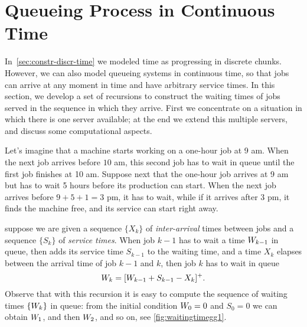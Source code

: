 



\section{Queueing Process in Continuous Time}
\label{sec:constr-gg1-queu}

In~\cref{sec:constr-discr-time} we modeled time as progressing in discrete chunks.
However, we can also model queueing systems in continuous time, so that jobs can arrive at any moment in time and have arbitrary service times.
In this section, we develop a set of recursions to construct the waiting times of jobs served in the sequence in which they arrive.
First we concentrate on a situation in which there is one server available; at the end we extend this multiple servers, and discuss some computational aspects.


Let's imagine that a machine starts working on a one-hour job at 9 am.
When the next job arrives before $10$ am, this second job has to wait in queue until the first job finishes at 10 am.
Suppose next that the one-hour job arrives at 9 am but has to wait 5 hours before its production can start.
When the next job arrives before $9+5+1= 3$ pm, it has to wait, while if it arrives after 3 pm, it finds the machine free, and its service can start right away.

 suppose we are given a sequence $\{X_k\}$ of \emph{inter-arrival} times between jobs and a sequence $\{S_k\}$ of \emph{service times}.
When job $k-1$ has to wait a time $W_{k-1}$ in queue, then adds its service time $S_{k-1}$ to the waiting time, and a time $X_k$ elapses between the arrival time of job $k-1$ and $k$, then job $k$ has to wait in queue
\begin{equation}\label{eq:56}
 W_{k} = [W_{k-1} + S_{k-1}-X_k]^+.
\end{equation}
Observe
that with this recursion it is easy to compute the sequence of waiting times $\{W_k\}$ in queue: from the initial condition $W_{0}=0$ and $S_0=0$ we can obtain $W_{1}$, and then $W_{2}$, and so on, see \cref{fig:waitingtimegg1}.



